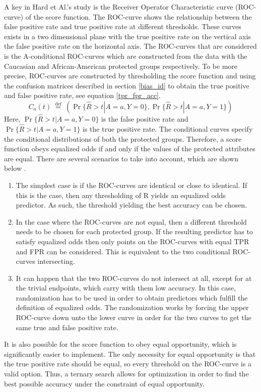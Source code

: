 \documentclass[11pt, fleqn, titlepage]{article}
\begin{document}
	A key in Hard et Al.'s study is the Receiver Operator Characteristic curve (ROC-curve) of the score function. The ROC-curve shows the relationship between the false positive rate and true positive rate at different thresholds. These curves exists in a two dimensional plane with the true positive rate on the vertical axis the false positive rate on the horizontal axis. The ROC-curves that are considered is the A-conditional ROC-curves which are constructed from the data with the Caucasian and African-American protected groups respectively. To be more precise, ROC-curves are constructed by thresholding the score function and using the confusion matrices described in section \ref{bias_id} to obtain the true positive and false positive rate, see equation \ref{tpr_fpr_acc}.
	\begin{equation*}\label{key}
	C_{a}(t) \stackrel{\text { def }}{=}(\operatorname{Pr}\{\widehat{R}>t | A=a, Y=0\}, \operatorname{Pr}\{\widehat{R}>t | A=a, Y=1\})
	\end{equation*}
	Here, $ \operatorname{Pr}\{\widehat{R}>t | A=a, Y=0\} $ is the false positive rate and $ \operatorname{Pr}\{\widehat{R}>t | A=a, Y=1\} $ is the true positive rate. The conditional curves specify the conditional distributions of both the protected groups. Therefore, a score function obeys equalized odds if and only if the values of the protected attributes are equal. There are several scenarios to take into account, which are shown below \cite{equal_of_oppor}.
	\begin{enumerate}
		\item The simplest case is if the ROC-curves are identical or close to identical. If this is the case, then any thresholding of R yields an equalized odds predictor. As such, the threshold yielding the best accuracy can be chosen.
		\item In the case where the ROC-curves are not equal, then a different threshold needs to be chosen for each protected group. If the resulting predictor has to satisfy equalized odds then only points on the ROC-curves with equal TPR and FPR can be considered. This is equivalent to the two conditional ROC-curves intersecting. 
		\item It can happen that the two ROC-curves do not intersect at all, except for at the trivial endpoints, which carry with them low accuracy. In this case, randomization has to be used in order to obtain predictors which fulfill the definition of equalized odds. The randomization works by forcing the upper ROC-curve down unto the lower curve in order for the two curves to get the same true and false positive rate.
	\end{enumerate}
	It is also possible for the score function to obey equal opportunity, which is significantly easier to implement. The only necessity for equal opportunity is that the true positive rate should be equal, so every threshold on the ROC-curve is a valid option. Thus, a ternary search allows for optimization in order to find the best possible accuracy under the constraint of equal opportunity.
	
\end{document}
